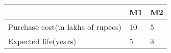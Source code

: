 \begin{table}[H]
\centering
\begin{tabularx}{0.5\textwidth}{|l|X|X|}
\hline
\textbf{} & \textbf{M1} & \textbf{M2} \\
\hline
Purchase cost(in lakhs of rupees) & 10 & 5 \\
\hline
Expected life(years) & 5 & 3 \\
\hline
\end{tabularx}
\caption*{}
\end{table}